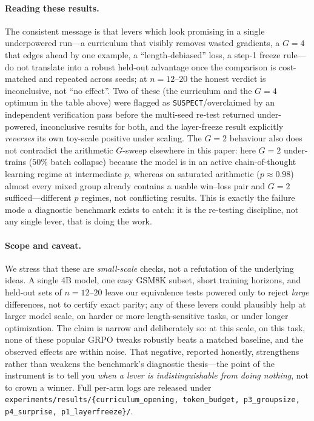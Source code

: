 \paragraph{Reading these results.}
The consistent message is that levers which look promising in a single
underpowered run---a curriculum that visibly removes wasted gradients, a
$G{=}4$ that edges ahead by one example, a ``length-debiased'' loss, a
step-1 freeze rule---do not translate into a robust held-out advantage
once the comparison is cost-matched and repeated across seeds; at
$n{=}12$--$20$ the honest verdict is inconclusive, not ``no effect''.
Two of these (the curriculum and the $G{=}4$ optimum in the table
above) were flagged as \texttt{SUSPECT}/overclaimed by an independent
verification pass before the multi-seed re-test returned
under-powered, inconclusive results for both, and the layer-freeze
result explicitly \emph{reverses} its own toy-scale positive under
scaling. The $G{=}2$ behaviour also does not contradict the
arithmetic $G$-sweep elsewhere in this paper: here $G{=}2$
under-trains ($50\%$ batch collapse) because the model is in an
active chain-of-thought learning regime at intermediate $p$,
whereas on saturated arithmetic ($p\approx0.98$) almost every
mixed group already contains a usable win--loss pair and $G{=}2$
sufficed---different $p$ regimes, not conflicting results. This is
exactly the failure mode a diagnostic benchmark exists to catch: it
is the re-testing discipline, not any single lever, that is doing
the work.

\paragraph{Scope and caveat.}
We stress that these are \emph{small-scale} checks, not a refutation of
the underlying ideas. A single 4B model, one easy GSM8K subset, short
training horizons, and held-out sets of $n{=}12$--$20$ leave our
equivalence tests powered only to reject \emph{large} differences, not
to certify exact parity; any of these levers could plausibly help at
larger model scale, on harder or more length-sensitive tasks, or under
longer optimization. The claim is narrow and deliberately so: at this
scale, on this task, none of these popular GRPO tweaks robustly beats a
matched baseline, and the observed effects are within noise. That
negative, reported honestly, strengthens rather than weakens the
benchmark's diagnostic thesis---the point of the instrument is to tell
you \emph{when a lever is indistinguishable from doing nothing}, not to
crown a winner. Full per-arm logs are released under
\texttt{experiments/results/\{curriculum\_opening, token\_budget,
p3\_groupsize, p4\_surprise, p1\_layerfreeze\}/}.

